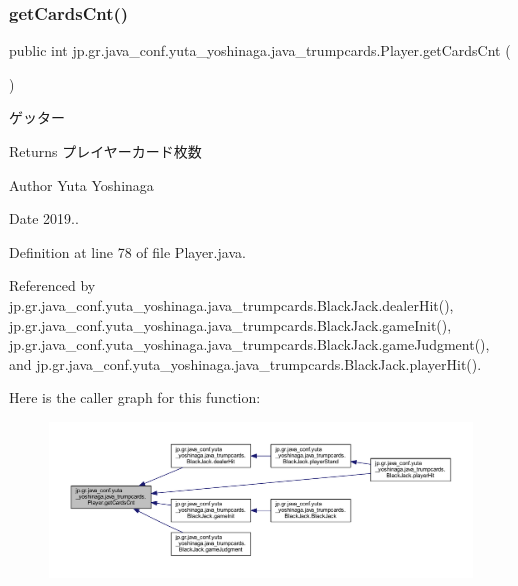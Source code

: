 \subsubsection{\texorpdfstring{get\+Cards\+Cnt()}{getCardsCnt()}}
{\footnotesize\ttfamily public int jp.\+gr.\+java\+\_\+conf.\+yuta\+\_\+yoshinaga.\+java\+\_\+trumpcards.\+Player.\+get\+Cards\+Cnt (\begin{DoxyParamCaption}{ }\end{DoxyParamCaption})}



ゲッター 

\begin{DoxyReturn}{Returns}
プレイヤーカード枚数 
\end{DoxyReturn}
\begin{DoxyAuthor}{Author}
Yuta Yoshinaga 
\end{DoxyAuthor}
\begin{DoxyDate}{Date}
2019.. 
\end{DoxyDate}


Definition at line 78 of file Player.\+java.



Referenced by jp.\+gr.\+java\+\_\+conf.\+yuta\+\_\+yoshinaga.\+java\+\_\+trumpcards.\+Black\+Jack.\+dealer\+Hit(), jp.\+gr.\+java\+\_\+conf.\+yuta\+\_\+yoshinaga.\+java\+\_\+trumpcards.\+Black\+Jack.\+game\+Init(), jp.\+gr.\+java\+\_\+conf.\+yuta\+\_\+yoshinaga.\+java\+\_\+trumpcards.\+Black\+Jack.\+game\+Judgment(), and jp.\+gr.\+java\+\_\+conf.\+yuta\+\_\+yoshinaga.\+java\+\_\+trumpcards.\+Black\+Jack.\+player\+Hit().

Here is the caller graph for this function\+:
\nopagebreak
\begin{figure}[H]
\begin{center}
\leavevmode
\includegraphics[width=350pt]{classjp_1_1gr_1_1java__conf_1_1yuta__yoshinaga_1_1java__trumpcards_1_1_player_ae905e0de5c47509076823375e6995806_icgraph}
\end{center}
\end{figure}
\mbox{\label{classjp_1_1gr_1_1java__conf_1_1yuta__yoshinaga_1_1java__trumpcards_1_1_player_a1158aaad3ebc046ddc15e7f5596b14b4}} 
